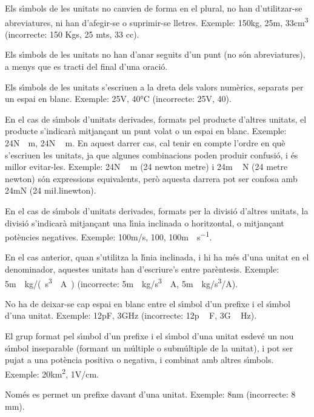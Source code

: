 Els s\'{\i}mbols de les unitats no canvien de forma en el plural, no han
d'utilitzar-se abreviatures, ni han d'afegir-se o suprimir-se
lletres. Exemple: 150\unit{kg}, 25\unit{m},  33\unit{cm^3}
(incorrecte: 150 Kgs, 25 mts, 33 cc).

Els s\'{\i}mbols de les unitats no han d'anar seguits d'un punt (no s\'{o}n
abreviatures), a menys que es tracti del final d'una oraci\'{o}.

Els s\'{\i}mbols de les unitats s'escriuen a la dreta dels valors
num\`{e}rics, separats per un espai en blanc. Exemple: 25\unit{V},
40\unit{\celsius} (incorrecte: 25V, 40\celsius).

En el cas de s\'{\i}mbols d'unitats derivades, formats pel producte
d'altres unitats, el producte s'indicar\`{a} mitjan\c{c}ant un punt volat o
un espai en blanc. Exemple: 24\unit{N\cdot m}, 24\unit{N\,m}. En
aquest darrer cas, cal tenir en compte  l'ordre en qu\`{e} s'escriuen
les unitats, ja que algunes combinacions poden produir confusi\'{o}, i
\'{e}s millor evitar-les. Exemple: 24\unit{N\,m} (24 newton metre) i
24\unit{m\,N} (24 metre newton) s\'{o}n expressions equivalents, per\`{o}
aquesta darrera pot ser confosa amb 24\unit{mN} (24 mi{\l.l}inewton).

En el cas de s\'{\i}mbols d'unitats derivades, formats per la divisi\'{o}
d'altres unitats, la divisi\'{o} s'indicar\`{a} mitjan\c{c}ant una l\'{\i}nia
inclinada o horitzontal, o mitjan\c{c}ant pot\`{e}ncies negatives. Exemple:
100\unit{m/s}, 100\unit{}, 100\unit{m\cdot s^{-1}}.

En el cas anterior, quan s'utilitza la l\'{\i}nia inclinada, i hi ha m\'{e}s
d'una unitat en el denominador, aquestes unitats han d'escriure's
entre par\`{e}ntesis. Exemple: 5\unit{m\cdot kg/(s^3\cdot A)}
(incorrecte: 5\unit{m\cdot kg/s^3\cdot A}, 5\unit{m\cdot kg/s^3/
A}).

No ha de deixar-se cap espai en blanc entre el s\'{\i}mbol d'un prefixe i
el s\'{\i}mbol d'una unitat. Exemple: 12\unit{pF}, 3\unit{GHz}
(incorrecte: 12\unit{p\,F}, 3\unit{G\,Hz}).

El grup format pel s\'{\i}mbol d'un prefixe i el s\'{\i}mbol d'una unitat
esdev\'{e} un nou s\'{\i}mbol inseparable (formant un m\'{u}ltiple o subm\'{u}ltiple
de la unitat), i pot ser pujat a una pot\`{e}ncia positiva o negativa, i
combinat amb altres s\'{\i}mbols. Exemple: 20\unit{km^2}, 1\unit{V/cm}.

Nom\'{e}s es permet un prefixe davant d'una unitat. Exemple: 8\unit{nm}
(incorrecte: 8 m\micro m).

